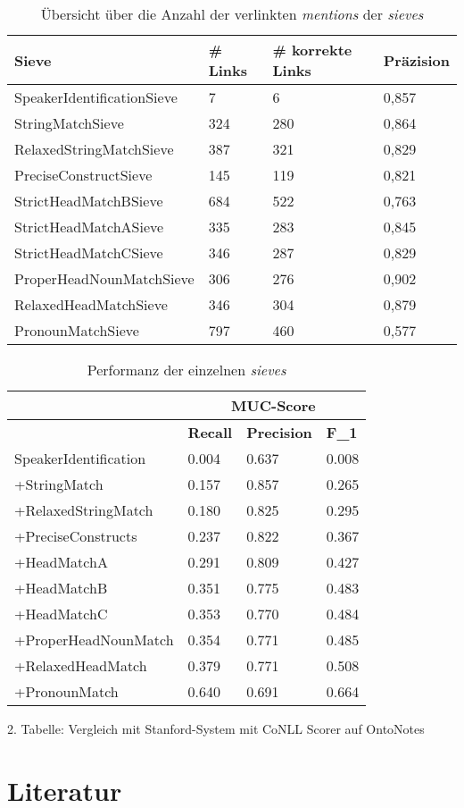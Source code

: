 \documentclass{scrartcl}
\begin{document}
\begin{table}[h]
\begin{tabular}{l||l|l|l}
\textbf{Sieve} & \textbf{\# Links} & \textbf{\# korrekte Links} & \textbf{Präzision} \\\hline
SpeakerIdentificationSieve & 7 & 6 & 0,857 \\
StringMatchSieve & 324 & 280 & 0,864\\
RelaxedStringMatchSieve & 387 & 321 & 0,829 \\
PreciseConstructSieve & 145 & 119 & 0,821 \\
StrictHeadMatchBSieve & 684 & 522 & 0,763 \\
StrictHeadMatchASieve & 335 & 283 & 0,845 \\
StrictHeadMatchCSieve & 346 & 287 & 0,829 \\
ProperHeadNounMatchSieve & 306 & 276 & 0,902 \\
RelaxedHeadMatchSieve & 346 & 304 & 0,879 \\
PronounMatchSieve & 797 & 460 & 0,577
\end{tabular}
\caption{Übersicht über die Anzahl der verlinkten \textit{mentions} der \textit{sieves}}
\label{tab:links}
\end{table}

\begin{table}[h]
\begin{tabular}{l||ll|l}
& \multicolumn{3}{c}{\textbf{MUC-Score}} \\ \hline
	                 & \textbf{Recall} & \textbf{Precision} & \textbf{F\_1} \\ \hline
SpeakerIdentification & 0.004  & 0.637     & 0.008    \\ 
+StringMatch          & 0.157  & 0.857     & 0.265    \\ 
+RelaxedStringMatch   & 0.180  & 0.825     & 0.295    \\ 
+PreciseConstructs    & 0.237  & 0.822     & 0.367    \\ 
+HeadMatchA           & 0.291  & 0.809     & 0.427    \\ 
+HeadMatchB           & 0.351  & 0.775     & 0.483    \\ 
+HeadMatchC           & 0.353  & 0.770     & 0.484    \\ 
+ProperHeadNounMatch  & 0.354  & 0.771     & 0.485    \\ 
+RelaxedHeadMatch     & 0.379  & 0.771     & 0.508    \\ 
+PronounMatch         & 0.640  & 0.691     & 0.664    \\ 
\end{tabular}
\caption{Performanz der einzelnen \textit{sieves}}
\label{tab:sieve_performanz}
\end{table}

2. Tabelle: Vergleich mit Stanford-System mit CoNLL Scorer auf OntoNotes\\


\clearpage

\nocite{*}
\renewcommand*{\refname}{} %
\section{Literatur}  
{}

\end{document}
